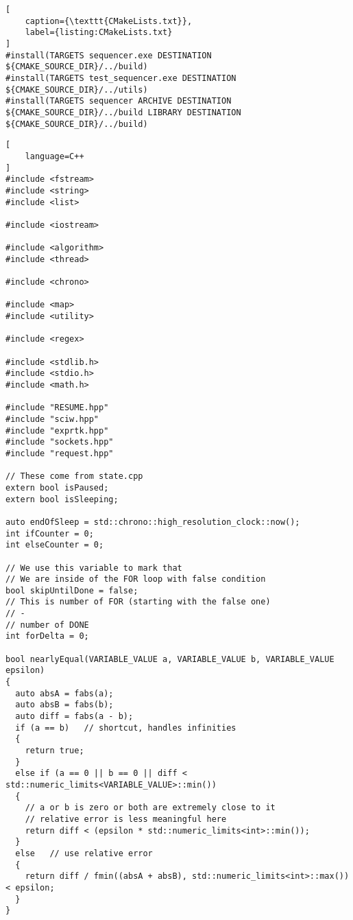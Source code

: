 \begin{lstlisting}[
	caption={\texttt{CMakeLists.txt}},
	label={listing:CMakeLists.txt}
]
#install(TARGETS sequencer.exe DESTINATION ${CMAKE_SOURCE_DIR}/../build)
#install(TARGETS test_sequencer.exe DESTINATION ${CMAKE_SOURCE_DIR}/../utils)
#install(TARGETS sequencer ARCHIVE DESTINATION ${CMAKE_SOURCE_DIR}/../build LIBRARY DESTINATION ${CMAKE_SOURCE_DIR}/../build)
\end{lstlisting}



\begin{lstlisting}[
	language=C++
]
#include <fstream>
#include <string>
#include <list>

#include <iostream>

#include <algorithm>
#include <thread>

#include <chrono>

#include <map>
#include <utility>

#include <regex>

#include <stdlib.h>
#include <stdio.h>
#include <math.h>

#include "RESUME.hpp"
#include "sciw.hpp"
#include "exprtk.hpp"
#include "sockets.hpp"
#include "request.hpp"

// These come from state.cpp
extern bool isPaused;
extern bool isSleeping;

auto endOfSleep = std::chrono::high_resolution_clock::now();
int ifCounter = 0;
int elseCounter = 0;

// We use this variable to mark that
// We are inside of the FOR loop with false condition
bool skipUntilDone = false;
// This is number of FOR (starting with the false one)
// -
// number of DONE
int forDelta = 0;

bool nearlyEqual(VARIABLE_VALUE a, VARIABLE_VALUE b, VARIABLE_VALUE epsilon)
{
  auto absA = fabs(a);
  auto absB = fabs(b);
  auto diff = fabs(a - b);
  if (a == b)   // shortcut, handles infinities
  {
    return true;
  }
  else if (a == 0 || b == 0 || diff < std::numeric_limits<VARIABLE_VALUE>::min())
  {
    // a or b is zero or both are extremely close to it
    // relative error is less meaningful here
    return diff < (epsilon * std::numeric_limits<int>::min());
  }
  else   // use relative error
  {
    return diff / fmin((absA + absB), std::numeric_limits<int>::max()) < epsilon;
  }
}



\end{lstlisting}

